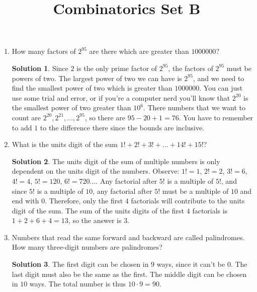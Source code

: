 \documentclass[twocolumn]{article}
\title{Combinatorics Set B}
\author{}
\date{}
\theoremstyle{definition}
\newtheorem*{solution}{Solution}
\begin{document}
\maketitle
\begin{enumerate}
    \item How many factors of $2^{95}$ are there which are greater than 
        $\num{1000000}$?
        \begin{solution}
            Since $2$ is the only prime factor of $2^{95}$, the factors of 
            $2^{95}$ must be powers of two. The largest power of two we can have 
            is $2^{95}$, and we need to find the smallest power of two which is 
            greater than $\num{1000000}$. You can just use some trial and error, 
            or if you're a computer nerd you'll know that $2^{20}$ is the 
            smallest power of two greater than $10^6$. There numbers that we 
            want to count are $2^{20}, 2^{21}, \dots, 2^{95}$, so there are $95 
            - 20 + 1 = 76$. You have to remember to add $1$ to the difference 
            there since the bounds are inclusive.
        \end{solution}
    \item What is the units digit of the sum $1! + 2! + 3! + \dots + 14! + 15!$?
        \begin{solution}
            The units digit of the sum of multiple numbers is only dependent on 
            the units digit of the numbers. Observe: $1! = 1$, $2! = 2$, $3! = 
            6$, $4! = 4$, $5! = 120$, $6! = 720 \dots$. Any factorial after $5!$ 
            is a multiple of $5!$, and since $5!$ is a multiple of $10$, any 
            factorial after $5!$ must be a multiple of $10$ and end with $0$. 
            Therefore, only the first $4$ factorials will contribute to the 
            units digit of the sum. The sum of the units digits of the first $4$ 
            factorials is $1 + 2 + 6 + 4 = 13$, so the answer is $3$.
        \end{solution}
    \item Numbers that read the same forward and backward are called 
        palindromes. How many three-digit numbers are palindromes?
        \begin{solution}
            The first digit can be chosen in $9$ ways, since it can't be $0$. 
            The last digit must also be the same as the first. The middle digit 
            can be chosen in $10$ ways. The total number is thus $10 \cdot 9 = 
            90$.
        \end{solution}

\end{enumerate}
\end{document}

